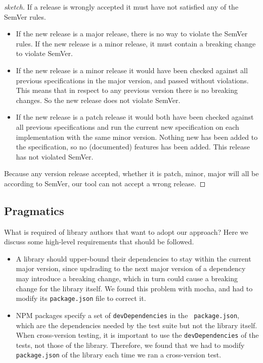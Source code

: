 \begin{proof}[sketch]
If a release is wrongly accepted it must have not satisfied any of the SemVer
rules. 

\begin{itemize}
    \item If the new release is a major release, there is no way to violate the
    SemVer rules. If the new release is a minor release, it must contain a breaking
    change to violate SemVer. 
    \item If the new release is a minor release it would have been checked against all
    previous specifications in the major version, and passed without violations.
    This means that in respect to any previous version there is no breaking
    changes. So the new release does not violate SemVer.\
    \item If the new release is a patch release it would both have been checked against all 
    previous specifications and run the current new specification on each
    implementation with the same minor version. Nothing new has been added to the
    specification, so no (documented) features has been added. This release has not
    violated SemVer.
\end{itemize}

Because any version release accepted, whether it is patch, minor, major will all be according to 
SemVer, our tool can not accept a wrong release.
\end{proof}

\subsection{Pragmatics}
What is required of library authors that want to adopt our approach?
Here we discuss some high-level requirements that should be followed.

\begin{itemize}
\item A library should upper-bound their dependencies to stay within
  the current major version, since updrading to the next major version
  of a dependency may introduce a breaking change, which in turn could
  cause a breaking change for the library itself. We found this
  problem with mocha, and had to modify its {\tt package.json} file to
  correct it.
\item NPM packages specify a set of {\tt devDependencies} in the {\tt
    package.json}, which are the dependencies needed by the test suite
  but not the library itself. When cross-version testing, it is
  important to use the {\tt devDependencies} of the tests, not those
  of the library. Therefore, we found that we had to modify {\tt
    package.json} of the library each time we ran a cross-version
  test.
\end{itemize}
